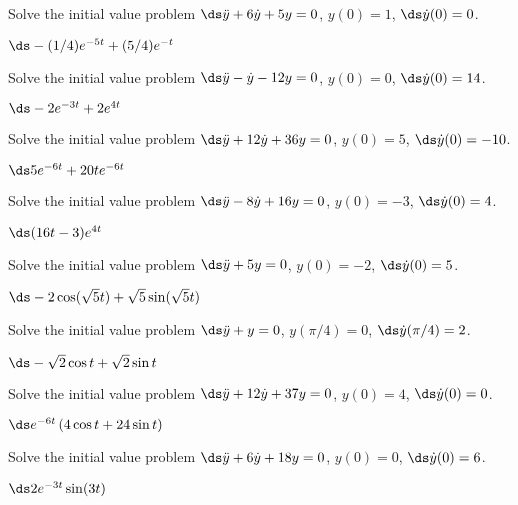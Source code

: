 \begin{exercises}
\begin{exercise}
\begin{exercise}
\begin{exercise}
\begin{exercise} Solve the initial value problem 
$\ds \ddot y+6\dot y +5y=0$,
$y(0)=1$, $\ds\dot y(0)=0$.
\begin{answer} $\ds -(1/4)e^{-5t}+(5/4)e^{-t}$
\end{answer}\end{exercise}
\begin{exercise} Solve the initial value problem 
$\ds\ddot y-\dot y-12y=0$,
$y(0)=0$, $\ds\dot y(0)=14$.
\begin{answer} $\ds-2e^{-3t}+2e^{4t}$
\end{answer}\end{exercise}
\begin{exercise} Solve the initial value problem 
$\ds\ddot y+12\dot y+36y=0$,
$y(0)=5$, $\ds\dot y(0)=-10$.
\begin{answer} $\ds 5e^{-6t}+20te^{-6t}$
\end{answer}\end{exercise}
\begin{exercise} Solve the initial value problem 
$\ds\ddot y-8\dot y+16y=0$,
$y(0)=-3$, $\ds\dot y(0)=4$.
\begin{answer} $\ds (16t-3)e^{4t}$
\end{answer}\end{exercise}
\begin{exercise} Solve the initial value problem 
$\ds\ddot y+5y=0$,
$y(0)=-2$, $\ds\dot y(0)=5$.
\begin{answer} $\ds -2\cos(\sqrt5t)+\sqrt{5}\sin(\sqrt{5}t)$
\end{answer}\end{exercise}
\begin{exercise} Solve the initial value problem 
$\ds\ddot y+y=0$,
$y(\pi/4)=0$, $\ds\dot y(\pi/4)=2$.
\begin{answer} $\ds -\sqrt2\cos t+\sqrt2\sin t$
\end{answer}\end{exercise}
\begin{exercise} Solve the initial value problem 
$\ds\ddot y+12\dot y+37y=0$,
$y(0)=4$, $\ds\dot y(0)=0$.
\begin{answer} $\ds e^{-6t}\left(4\cos t+24\sin t\right)$
\end{answer}\end{exercise}
\begin{exercise} Solve the initial value problem 
$\ds\ddot y+6\dot y+18y=0$,
$y(0)=0$, $\ds\dot y(0)=6$.
\begin{answer} $\ds 2e^{-3t}\sin(3t)$

\end{answer}
\end{exercise}
\end{exercise}
\end{exercise}
\end{exercise}
\end{exercises}
